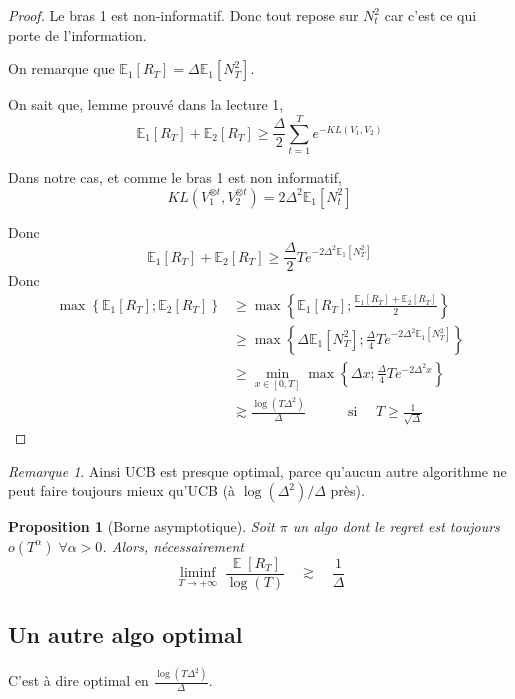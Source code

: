 \documentclass{article}
\DeclareMathOperator*{\E}{\mathbb{E}}
\newtheorem{proposition}{Proposition}[section]
\theoremstyle{remark}
\theoremstyle{remark}
\newtheorem{remark}{Remarque}[section]
\begin{document}
\begin{proof}
   Le bras 1 est non-informatif. Donc tout repose sur $N_t^2$ car c'est ce qui porte de l'information.

   On remarque que $\mathbb{E}_1[R_T] = \Delta \mathbb{E}_1[N_T^2]$.

   On sait que, lemme prouvé dans la lecture 1,
   $$
   \mathbb{E}_1[R_T] + \mathbb{E}_2[R_T] \geq \frac{\Delta}{2} \sum_{t=1}^T e^{-KL(V_1,V_2)}
   $$

   Dans notre cas, et comme le bras 1 est non informatif,
   $$
   KL(V_1^{\otimes t}, V_2^{\otimes t}) = 2 \Delta^2 \mathbb{E}_1[N_t^2]
   $$

   Donc
   $$
   \mathbb{E}_1[R_T] + \mathbb{E}_2[R_T] \geq \frac{\Delta}{2} T e^{-2 \Delta^2 \mathbb{E}_1[N_T^2]}
   $$
   Donc
   \begin{align*}
      \max\left\{ \mathbb{E}_1[R_T]; \mathbb{E}_2[R_T] \right\} &\geq \max\left\{ \mathbb{E}_1[R_T]; \frac{\mathbb{E}_1[R_T] + \mathbb{E}_2[R_T]}{2} \right\} \\
      &\geq \max\left\{ \Delta \mathbb{E}_1[N_T^2] ; \frac{\Delta}{4} T e^{-2 \Delta^2 \mathbb{E}_1[N_T^2]} \right\} \\
      &\geq \min_{x \in [0,T]} \max\left\{ \Delta x ; \frac{\Delta}{4} T e^{-2 \Delta^2 x} \right\} \\
      &\gtrsim \frac{\log(T \Delta^2)}{\Delta} \quad \quad \quad \text{si }\quad  T \geq \frac{1}{\sqrt{\Delta}}
   \end{align*}
\end{proof}

\begin{remark}
   Ainsi UCB est presque optimal, parce qu'aucun autre algorithme ne peut faire toujours mieux qu'UCB (à $\log(\Delta^2) / \Delta$ près).
\end{remark}

\begin{proposition}[Borne asymptotique]
   Soit $\pi$ un algo dont le regret est toujours $o(T^\alpha) \; \forall \alpha > 0$. Alors, nécessairement
   $$
   \liminf_{T \to +\infty} \; \frac{\E[R_T]}{\log(T)} \quad \gtrsim \quad \frac{1}{\Delta}
   $$
\end{proposition}

\subsection{Un autre algo optimal}

C'est à dire optimal en $\frac{\log(T\Delta^2)}{\Delta}$.
\end{document}
